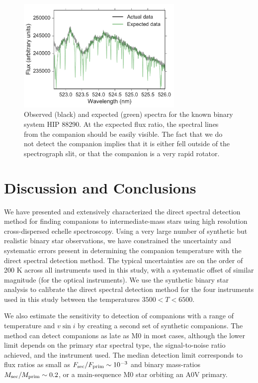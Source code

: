 \documentclass{emulateapj}
\begin{document}
\begin{figure}
        \centering
        \includegraphics[width= 80mm]{HIP_88290_Flux.pdf}
         \caption{Observed (black) and expected (green) spectra for the known binary system HIP 88290. At the expected flux ratio, the spectral lines from the companion should be easily visible. The fact that we do not detect the companion implies that it is either fell outside of the spectrograph slit, or that the companion is a very rapid rotator.}
         \label{fig:expected}
\end{figure}

\section{Discussion and Conclusions}
\label{sec:conclusions}
We have presented and extensively characterized the direct spectral detection method for finding companions to intermediate-mass stars using high resolution cross-dispersed echelle spectroscopy. Using a very large number of synthetic but realistic binary star observations, we have constrained the uncertainty and systematic errors present in determining the companion temperature with the direct spectral detection method. The typical uncertainties are on the order of 200 K across all instruments used in this study, with a systematic offset of similar magnitude (for the optical instruments). We use the synthetic binary star analysis to calibrate the direct spectral detection method for the four instruments used in this study between the temperatures $ 3500 < T < 6500$.

We also estimate the sensitivity to detection of companions with a range of temperature and $v\sin{i}$ by creating a second set of synthetic companions. The method can detect companions as late as M0 in most cases, although the lower limit depends on the primary star spectral type, the signal-to-noise ratio achieved, and the instrument used. The median detection limit corresponds to flux ratios as small as $F_{\rm  sec}/F_{\rm prim} \sim 10^{-3}$ and binary mass-ratios $M_{\rm  sec}/M_{\rm prim} \sim 0.2$, or a main-sequence M0 star orbiting an A0V primary.
\end{document}
